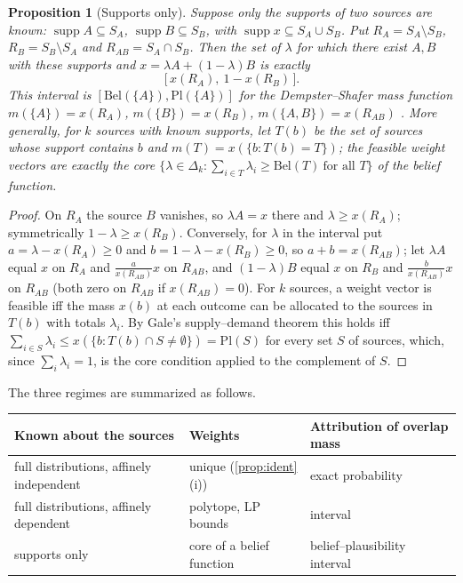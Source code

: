 \documentclass[11pt]{article}
\newtheorem{proposition}[theorem]{Proposition}
\theoremstyle{definition}
\theoremstyle{remark}
\begin{document}
\begin{proposition}[Supports only]\label{prop:supports}
Suppose only the supports of two sources are known: $\operatorname{supp}A\subseteq S_A$,
$\operatorname{supp}B\subseteq S_B$, with $\operatorname{supp}x\subseteq S_A\cup S_B$. Put
$R_A=S_A\setminus S_B$, $R_B=S_B\setminus S_A$ and $R_{AB}=S_A\cap S_B$. Then the set of $\lambda$ for
which there exist $A,B$ with these supports and $x=\lambda A+(1-\lambda)B$ is exactly
\[
\big[\,x(R_A),\ 1-x(R_B)\,\big].
\]
This interval is $[\mathrm{Bel}(\{A\}),\mathrm{Pl}(\{A\})]$ for the Dempster--Shafer mass function
$m(\{A\})=x(R_A)$, $m(\{B\})=x(R_B)$, $m(\{A,B\})=x(R_{AB})$ \cite{Dempster1967,Shafer1976}. More
generally, for $k$ sources with known supports, let $T(b)$ be the set of sources whose support
contains $b$ and $m(T)=x(\{b:T(b)=T\})$; the feasible weight vectors are exactly the core
$\{\lambda\in\Delta_k:\sum_{i\in T}\lambda_i\ge\mathrm{Bel}(T)\ \text{for all }T\}$ of the belief
function.
\end{proposition}
\begin{proof}
On $R_A$ the source $B$ vanishes, so $\lambda A=x$ there and $\lambda\ge x(R_A)$; symmetrically
$1-\lambda\ge x(R_B)$. Conversely, for $\lambda$ in the interval put $a=\lambda-x(R_A)\ge0$ and
$b=1-\lambda-x(R_B)\ge0$, so $a+b=x(R_{AB})$; let $\lambda A$ equal $x$ on $R_A$ and
$\tfrac{a}{x(R_{AB})}x$ on $R_{AB}$, and $(1-\lambda)B$ equal $x$ on $R_B$ and $\tfrac{b}{x(R_{AB})}x$ on
$R_{AB}$ (both zero on $R_{AB}$ if $x(R_{AB})=0$). For $k$ sources, a weight vector is feasible iff the
mass $x(b)$ at each outcome can be allocated to the sources in $T(b)$ with totals $\lambda_i$. By
Gale's supply--demand theorem \cite{Gale1957} this holds iff $\sum_{i\in S}\lambda_i\le
x(\{b:T(b)\cap S\ne\emptyset\})=\mathrm{Pl}(S)$ for every set $S$ of sources, which, since
$\sum_i\lambda_i=1$, is the core condition applied to the complement of $S$.
\end{proof}

The three regimes are summarized as follows.

\begin{center}
\begin{tabular}{@{}lll@{}}
\toprule
Known about the sources & Weights & Attribution of overlap mass\\
\midrule
full distributions, affinely independent & unique (\cref{prop:ident}(i)) & exact probability\\
full distributions, affinely dependent & polytope, LP bounds & interval\\
supports only & core of a belief function & belief--plausibility interval\\
\bottomrule
\end{tabular}
\end{center}
\end{document}
